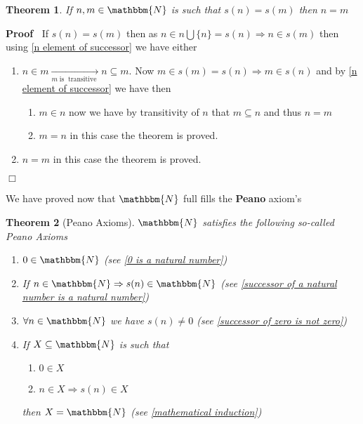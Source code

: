 \documentclass{book}
\newcommand{\Rightarrowlim}{\mathop{\rightarrow}\limits}
\newcommand{\tmop}[1]{\ensuremath{\operatorname{#1}}}
\newcommand{\tmtextbf}[1]{{\bfseries{#1}}}
\newenvironment{proof}{\noindent\textbf{Proof\ }}{\hspace*{\fill}$\Box$\medskip}
\newtheorem{theorem}{Theorem}
\begin{document}
{{\begin{theorem}
  \label{if successors are equal numbers are equal}If $n, m \in \mathbbm{N}$
  is such that $s (n) = s (m)$ then $n = m$
\end{theorem}

\begin{proof}
  If $s (n) = s (m)$ then as $n \in n \bigcup \{ n \} = s (n) \Rightarrow n
  \in s (m)$ then using \ref{n element of successor} we have either
  \begin{enumerate}
    \item $n \in m \Rightarrowlim_{m \tmop{is} \tmop{transitive}} n \subseteq
    m$. Now $m \in s (m) = s (n) \Rightarrow m \in s (n)$ and by \ref{n
    element of successor} we have then
    \begin{enumerate}
      \item $m \in n$ now we have by transitivity of $n$ that $m \subseteq n$
      and thus $n = m$
      
      \item $m = n$ in this case the theorem is proved.
    \end{enumerate}
    \item $n = m$ in this case the theorem is proved.
  \end{enumerate}
\end{proof}

We have proved now that $\mathbbm{N}$ full fills the \tmtextbf{Peano} axiom's

\begin{theorem}[Peano Axioms]
  \label{peano axioms}{}$\mathbbm{N}$ satisfies the
  following so-called Peano Axioms
  \begin{enumerate}
    \item $0 \in \mathbbm{N}$ (see \ref{0 is a natural number})
    
    \item If $n \in \mathbbm{N} \Rightarrow s (n) \in \mathbbm{N}$ (see
    \ref{successor of a natural number is a natural number})
    
    \item $\forall n \in \mathbbm{N}$ we have $s (n) \neq 0$ (see
    \ref{successor of zero is not zero})
    
    \item If $X \subseteq \mathbbm{N}$ is such that
    \begin{enumerate}
      \item $0 \in X$
      
      \item $n \in X \Rightarrow s (n) \in X$
    \end{enumerate}
    then $X =\mathbbm{N}$ (see \ref{mathematical induction})
    

\end{enumerate}
\end{theorem}}}
\end{document}
